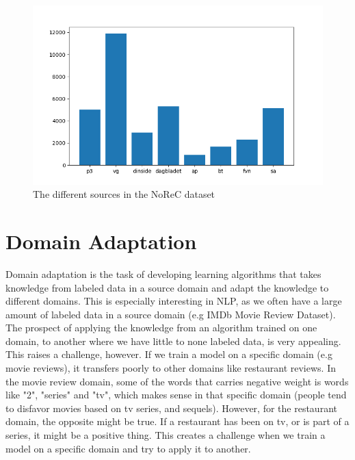 \documentclass{report}
\begin{document}
\begin{figure}[h!]
	\centering
	\includegraphics[scale=0.5]{img/src_dist}
	\caption{The different sources in the NoReC dataset}
	\label{fig:sources}
\end{figure}%

\section{Domain Adaptation}
Domain adaptation is the task of developing learning algorithms that takes knowledge from labeled data in a source domain and adapt the knowledge to different domains. This is especially interesting in NLP, as we often have a large amount of labeled data in a source domain (e.g IMDb Movie Review Dataset). The prospect of applying the knowledge from an algorithm trained on one domain, to another where we have little to none labeled data, is very appealing. This raises a challenge, however. If we train a model on a specific domain (e.g movie reviews), it transfers poorly to other domains like restaurant reviews. In the movie review domain, some of the words that carries negative weight is words like "2", "series" and "tv", which makes sense in that specific domain (people tend to disfavor movies based on tv series, and sequels). However, for the restaurant domain, the opposite might be true. If a restaurant has been on tv, or is part of a series, it might be a positive thing. This creates a challenge when we train a model on a specific domain and try to apply it to another.

\end{document}
